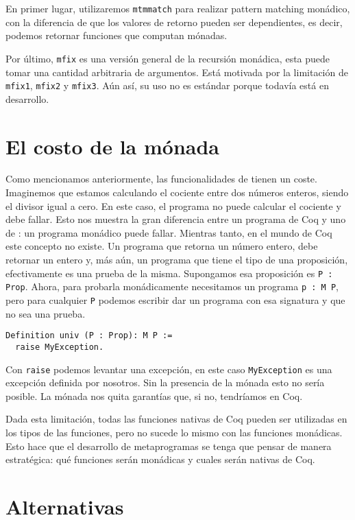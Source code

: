 En primer lugar, utilizaremos \lstinline{mtmmatch} para realizar pattern matching monádico, con la diferencia de que los valores de retorno pueden ser dependientes, es decir, podemos retornar funciones que computan mónadas.

Por último, \lstinline{mfix} es una versión general de la recursión monádica, esta puede tomar una cantidad arbitraria de argumentos. Está motivada por la limitación de \lstinline{mfix1}, \lstinline{mfix2} y \lstinline{mfix3}.
Aún así, su uso no es estándar porque todavía está en desarrollo.

\section{El costo de la mónada}

Como mencionamos anteriormente, las funcionalidades de \Mtac tienen un coste.
Imaginemos que estamos calculando el cociente entre dos números enteros, siendo el divisor igual a cero.
En este caso, el programa no puede calcular el cociente y debe fallar.
Esto nos muestra la gran diferencia entre un programa de Coq y uno de \mtac: un programa monádico puede fallar.
Mientras tanto, en el mundo de Coq este concepto no existe.
Un programa que retorna un número entero, debe retornar un entero y, más aún, un programa que tiene el tipo de una proposición, efectivamente es una prueba de la misma.
Supongamos esa proposición es \lstinline{P : Prop}.
Ahora, para probarla monádicamente necesitamos un programa \lstinline{p : M P}, pero para cualquier \lstinline{P} podemos escribir dar un programa con esa signatura y que no sea una prueba.

\begin{lstlisting}
Definition univ (P : Prop): M P :=
  raise MyException.
\end{lstlisting}

Con \lstinline{raise} podemos levantar una excepción, en este caso \lstinline{MyException} es una excepción definida por nosotros.
Sin la presencia de la mónada esto no sería posible.
La mónada nos quita garantías que, si no, tendríamos en Coq.

Dada esta limitación, todas las funciones nativas de Coq pueden ser utilizadas en los tipos de las funciones, pero no sucede lo mismo con las funciones monádicas.
Esto hace que el desarrollo de metaprogramas se tenga que pensar de manera estratégica: qué funciones serán monádicas y cuales serán nativas de Coq.

\section{Alternativas}

